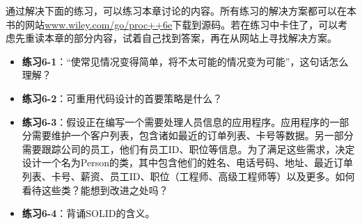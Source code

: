 通过解决下面的练习，可以练习本章讨论的内容。所有练习的解决方案都可以在本书的网站\url{www.wiley.com/go/proc++6e}下载到源码。若在练习中卡住了，可以考虑先重读本章的部分内容，试着自己找到答案，再在从网站上寻找解决方案。

\begin{itemize}
\item
\textbf{练习6-1}：“使常见情况变得简单，将不太可能的情况变为可能”，这句话怎么理解？

\item
\textbf{练习6-2}：可重用代码设计的首要策略是什么？

\item
\textbf{练习6-3}：假设正在编写一个需要处理人员信息的应用程序。应用程序的一部分需要维护一个客户列表，包含诸如最近的订单列表、卡号等数据。另一部分需要跟踪公司的员工，他们有员工ID、职位等信息。为了满足这些需求，决定设计一个名为Person的类，其中包含他们的姓名、电话号码、地址、最近订单列表、卡号、薪资、员工ID、职位（工程师、高级工程师等）以及更多。如何看待这些类？能想到改进之处吗？

\item
\textbf{练习6-4}：背诵SOLID的含义。
\end{itemize}